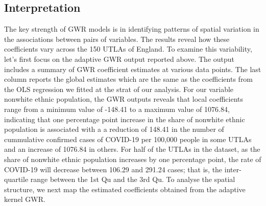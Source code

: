 \documentclass[]{book}
\begin{document}
\subsection{Interpretation}\label{interpretation-1}

The key strength of GWR models is in identifying patterns of spatial
variation in the associations between pairs of variables. The results
reveal how these coefficients vary across the 150 UTLAs of England. To
examine this variability, let's first focus on the adaptive GWR output
reported above. The output includes a summary of GWR coefficient
estimates at various data points. The last column reports the global
estimates which are the same as the coefficients from the OLS regression
we fitted at the strat of our analysis. For our variable nonwhite ethnic
population, the GWR outputs reveals that local coefficients range from a
minimum value of -148.41 to a maximum value of 1076.84, indicating that
one percentage point increase in the share of nonwhite ethnic population
is associated with a a reduction of 148.41 in the number of cummulative
confirmed cases of COVID-19 per 100,000 people in some UTLAs and an
increase of 1076.84 in others. For half of the UTLAs in the dataset, as
the share of nonwhite ethnic population increases by one percentage
point, the rate of COVID-19 will decrease between 106.29 and 291.24
cases; that is, the inter-quartile range between the 1st Qu and the 3rd
Qu. To analyse the spatial structure, we next map the estimated
coefficients obtained from the adaptive kernel GWR.
\end{document}
